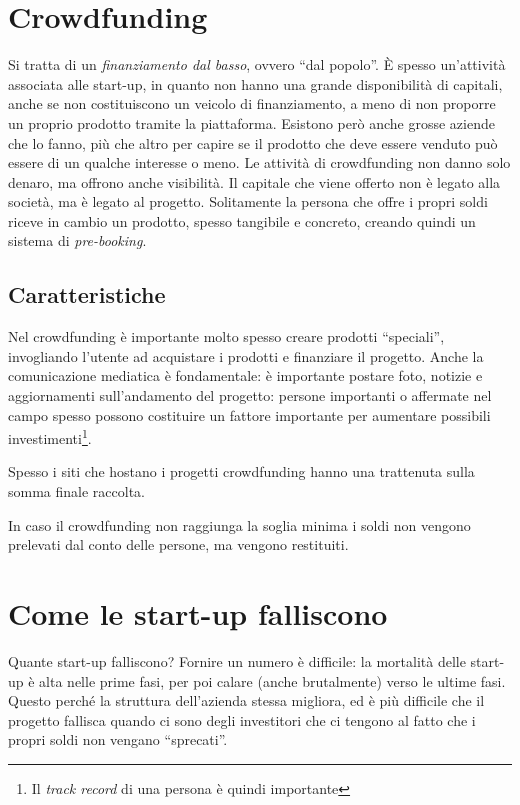 \section{Crowdfunding}

Si tratta di un \textit{finanziamento dal basso}, ovvero ``dal popolo''. È
spesso un'attività associata alle start-up, in quanto non hanno una grande
disponibilità di capitali, anche se non costituiscono un veicolo di
finanziamento, a meno di non proporre un proprio prodotto tramite la
piattaforma. Esistono però anche grosse aziende che lo fanno, più che altro per
capire se il prodotto che deve essere venduto può essere di un qualche interesse
o meno. Le attività di crowdfunding non danno solo denaro, ma offrono anche
visibilità. Il capitale che viene offerto non è legato alla società, ma è legato
al progetto. Solitamente la persona che offre i propri soldi riceve in cambio un
prodotto, spesso tangibile e concreto, creando quindi un sistema di
\textit{pre-booking}.

\subsection{Caratteristiche}

Nel crowdfunding è importante molto spesso creare prodotti ``speciali'',
invogliando l'utente ad acquistare i prodotti e finanziare il progetto. Anche
la comunicazione mediatica è fondamentale: è importante postare foto, notizie e
aggiornamenti sull'andamento del progetto: persone importanti o affermate nel
campo spesso possono costituire un fattore importante per aumentare possibili
investimenti\footnote{Il \textit{track record} di una persona è quindi
importante}.

Spesso i siti che hostano i progetti crowdfunding hanno una trattenuta sulla
somma finale raccolta.

In caso il crowdfunding non raggiunga la soglia minima i soldi non vengono
prelevati dal conto delle persone, ma vengono restituiti.

\section{Come le start-up falliscono}

Quante start-up falliscono? Fornire un numero è difficile: la mortalità delle
start-up è alta nelle prime fasi, per poi calare (anche brutalmente) verso le
ultime fasi. Questo perché la struttura dell'azienda stessa migliora, ed è più
difficile che il progetto fallisca quando ci sono degli investitori che ci
tengono al fatto che i propri soldi non vengano ``sprecati''.

